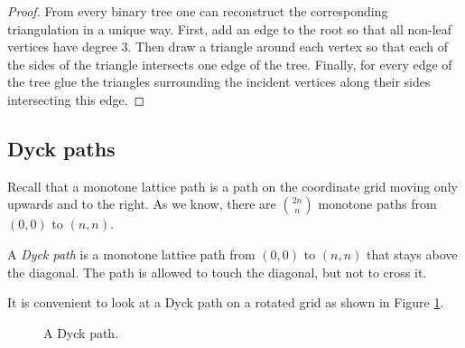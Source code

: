 \begin{page}
\begin{proof}
From every binary tree one can reconstruct the corresponding triangulation in a unique way.
First, add an edge to the root so that all non-leaf vertices have degree $3$.
Then draw a triangle around each vertex so that each of the sides of the triangle intersects one edge of the tree.
Finally, for every edge of the tree glue the triangles surrounding the incident vertices along their sides intersecting this edge.
\end{proof}




\end{page}

\begin{page}
\setcounter{section}{4}
\setcounter{subsection}{5}
\setcounter{dfn}{6}
\label{portion:878}

\subsection{Dyck paths}
Recall that a monotone lattice path is a path on the coordinate grid moving only upwards and to the right.
As we know, there are $\binom{2n}{n}$ monotone paths from $(0,0)$ to $(n,n)$.


\end{page}

\begin{page}
\setcounter{section}{4}
\setcounter{subsection}{5}
\setcounter{dfn}{7}
\label{portion:880}

\begin{dfn}
A \emph{Dyck path} is a monotone lattice path from $(0,0)$ to $(n,n)$ that stays above the diagonal.
The path is allowed to touch the diagonal, but not to cross it.
\end{dfn}

\end{page}

\begin{page}
\setcounter{section}{4}
\setcounter{subsection}{5}
\setcounter{dfn}{7}
\label{portion:881}


It is convenient to look at a Dyck path on a rotated grid as shown in Figure \ref{fig:DyckPath}.

\begin{figure}[ht]
\begin{center}

\end{center}
\caption{A Dyck path.}
\label{fig:DyckPath}
\end{figure}



\end{page}


